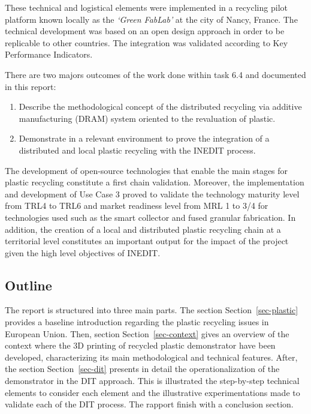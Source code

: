 \documentclass[
  11pt,
]{article}
\providecommand{\tightlist}{%
  \setlength{\itemsep}{0pt}\setlength{\parskip}{0pt}}\usepackage{longtable,booktabs,array}
\begin{document}
These technical and logistical elements were implemented in a recycling
pilot platform known locally as the \emph{`Green FabLab'} at the city of
Nancy, France. The technical development was based on an open design
approach in order to be replicable to other countries. The integration
was validated according to Key Performance Indicators.

There are two majors outcomes of the work done within task 6.4 and
documented in this report:

\begin{enumerate}
\def\labelenumi{\arabic{enumi}.}
\tightlist
\item
  Describe the methodological concept of the distributed recycling via
  additive manufacturing (DRAM) system oriented to the revaluation of
  plastic.
\item
  Demonstrate in a relevant environment to prove the integration of a
  distributed and local plastic recycling with the INEDIT process.
\end{enumerate}

The development of open-source technologies that enable the main stages
for plastic recycling constitute a first chain validation. Moreover, the
implementation and development of Use Case 3 proved to validate the
technology maturity level from TRL4 to TRL6 and market readiness level
from MRL 1 to 3/4 for technologies used such as the smart collector and
fused granular fabrication. In addition, the creation of a local and
distributed plastic recycling chain at a territorial level constitutes
an important output for the impact of the project given the high level
objectives of INEDIT.

\hypertarget{outline}{%
\subsection{Outline}\label{outline}}

The report is structured into three main parts. The section
Section~\ref{sec-plastic} provides a baseline introduction regarding the
plastic recycling issues in European Union. Then, section
Section~\ref{sec-context} gives an overview of the context where the 3D
printing of recycled plastic demonstrator have been developed,
characterizing its main methodological and technical features. After,
the section Section~\ref{sec-dit} presents in detail the
operationalization of the demonstrator in the DIT approach. This is
illustrated the step-by-step technical elements to consider each element
and the illustrative experimentations made to validate each of the DIT
process. The rapport finish with a conclusion section.
\end{document}
